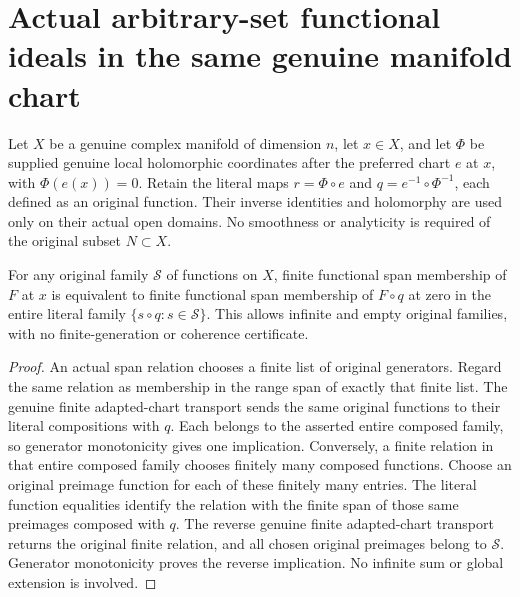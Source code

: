 \section{Actual arbitrary-set functional ideals in the same genuine manifold chart}

Let $X$ be a genuine complex manifold of dimension $n$, let $x\in X$,
and let $\Phi$ be supplied genuine local holomorphic coordinates after
the preferred chart $e$ at $x$, with $\Phi(e(x))=0$. Retain the literal
maps $r=\Phi\circ e$ and $q=e^{-1}\circ\Phi^{-1}$, each defined as an
original function. Their inverse identities and holomorphy are used only
on their actual open domains. No smoothness or analyticity is required
of the original subset $N\subset X$.

\begin{lemma}
\label{hir:actual-singular-chart-entire-functional-span}
\leanok
For any original family $\mathcal S$ of functions on $X$, finite
functional span membership of $F$ at $x$ is equivalent to finite
functional span membership of $F\circ q$ at zero in the entire literal
family $\{s\circ q:s\in\mathcal S\}$. This allows infinite and empty
original families, with no finite-generation or coherence certificate.
\end{lemma}
\begin{proof}
An actual span relation chooses a finite list of original generators.
Regard the same relation as membership in the range span of exactly that
finite list. The genuine finite adapted-chart transport sends the same
original functions to their literal compositions with $q$. Each belongs
to the asserted entire composed family, so generator monotonicity gives
one implication. Conversely, a finite relation in that entire composed
family chooses finitely many composed functions. Choose an original
preimage function for each of these finitely many entries. The literal
function equalities identify the relation with the finite span of those
same preimages composed with $q$. The reverse genuine finite adapted-chart
transport returns the original finite relation, and all chosen original
preimages belong to $\mathcal S$. Generator monotonicity proves the
reverse implication. No infinite sum or global extension is involved.
\end{proof}

